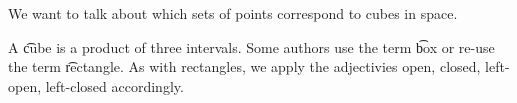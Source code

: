 

We want to talk about which sets of points correspond to cubes in space.


A \t{cube} is a product of three intervals.
Some authors use the term \t{box} or re-use the term \t{rectangle}.
As with rectangles, we apply the adjectivies open, closed, left-open, left-closed accordingly.

\blankpage
